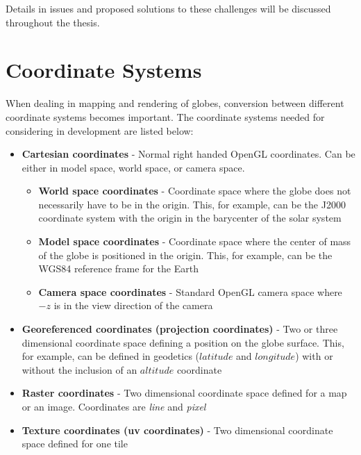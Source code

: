 Details in issues and proposed solutions to these challenges will be discussed throughout the thesis.

\section{Coordinate Systems}

When dealing in mapping and rendering of globes, conversion between different coordinate systems becomes important. The coordinate systems needed for considering in development are listed below:

\begin{itemize}
\item \textbf{Cartesian coordinates} - Normal right handed OpenGL coordinates. Can be either in model space, world space, or camera space.

\begin{itemize}
\item \textbf{World space coordinates} - Coordinate space where the globe does not necessarily have to be in the origin. This, for example, can be the J2000 coordinate system with the origin in the barycenter of the solar system
\item \textbf{Model space coordinates} - Coordinate space where the center of mass of the globe is positioned in the origin. This, for example, can be the WGS84 reference frame for the Earth
\item \textbf{Camera space coordinates} - Standard OpenGL camera space where $-z$ is in the view direction of the camera
\end{itemize}

\item \textbf{Georeferenced coordinates (projection coordinates)} - Two or three dimensional coordinate space defining a position on the globe surface. This, for example, can be defined in geodetics ($latitude$ and $longitude$) with or without the inclusion of an $altitude$ coordinate

\item \textbf{Raster coordinates} - Two dimensional coordinate space defined for a map or an image. Coordinates are \emph{line} and \emph{pixel}

\item \textbf{Texture coordinates (uv coordinates)} - Two dimensional coordinate space defined for one tile

\end{itemize}

